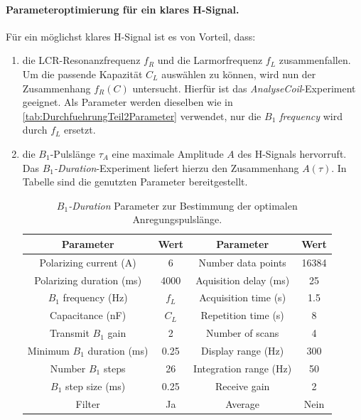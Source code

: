 \documentclass[../main.tex]{subfiles}
\begin{document}
    \paragraph{Parameteroptimierung für ein klares H-Signal.}
        Für ein möglichst klares H-Signal ist es von Vorteil, dass:
        \begin{enumerate}
            \item die LCR-Resonanzfrequenz $f_R$ und die Larmorfrequenz $f_L$ zusammenfallen. Um die passende Kapazität $C_L$ auswählen zu können, wird nun der Zusammenhang $f_R(C)$ untersucht. Hierfür ist das \textit{AnalyseCoil}-Experiment geeignet. Als Parameter werden dieselben wie in \ref{tab:DurchfuehrungTeil2Parameter} verwendet, nur die \textit{$B_1$ frequency} wird durch $f_L$ ersetzt.
 
            
            \item die $B_1$-Pulslänge $\tau_A$ eine maximale Amplitude $A$ des H-Signals hervorruft. Das \textit{$B_1$-Duration}-Experiment liefert hierzu den Zusammenhang $A(\tau)$. In Tabelle sind die genutzten Parameter bereitgestellt.\\

            \begin{table}[H]
                \centering
                \begin{tabular}{cc|cc}
                    \textbf{Parameter} & \textbf{Wert} & \textbf{Parameter} & \textbf{Wert}  \\\hline\hline
                    Polarizing current (\si{\ampere}) & 6 & Number data points & 16384\\\hline
                    Polarizing duration (\si{\milli\second}) & 4000 & Aquisition delay (\si{\milli\second}) & 25\\\hline
                    $B_1$ frequency (\si{\hertz}) & $f_L$ & Acquisition time (\si{\second}) & \num{1.5}\\\hline
                    Capacitance (\si{\nano\farad}) & $C_L$ & Repetition time (\si{\second}) & 8\\\hline
                    Transmit $B_1$ gain & 2 & Number of scans & 4\\\hline
                    Minimum $B_1$ duration (\si{\milli\second}) & \num{0.25} & Display range (\si{\hertz}) & 300\\\hline
                    Number $B_1$ steps & 26 & Integration range (\si{\hertz}) & 50\\\hline
                    $B_1$ step size (\si{\milli\second}) & \num{0.25} & Receive gain & 2\\\hline
                    Filter & Ja & Average & Nein
                \end{tabular}
                \caption{\textit{$B_1$-Duration} Parameter zur Bestimmung der optimalen Anregungspulslänge.}
                \label{tab:DurchfuehrungTeil3ParameterB1Duration}
            \end{table}



\end{enumerate}
\end{document}
